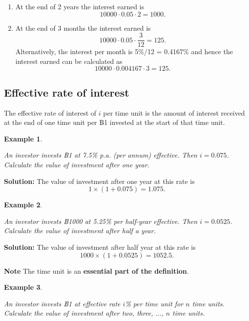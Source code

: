 \documentclass[landscape, 20pt]{extreport}
\theoremstyle{definition}
\theoremstyle{definition}
\newtheorem{example}{Example}[chapter]
\theoremstyle{definition}
\theoremstyle{definition}
\theoremstyle{remark}
\begin{document}
\begin{enumerate}
\def\labelenumi{\arabic{enumi}.}
\item
  At the end of 2 years the interest earned is
  \[10000 \cdot 0.05 \cdot 2 = 1000.\]
\item
  At the end of 3 months the interest earned is
  \[10000 \cdot 0.05 \cdot \frac{3}{12} = 125.\] Alternatively, the
  interest per month is 5\%/12 = 0.4167\% and hence the interest earned
  can be calculated as \[10000 \cdot 0.004167 \cdot 3 = 125.\]
\end{enumerate}

\hypertarget{effective-rate-of-interest}{%
\subsection{Effective rate of interest}\label{effective-rate-of-interest}}

The effective rate of interest of \(i\) per time unit is the amount of
interest received at the end of one time unit per ฿1 invested at the
start of that time unit.

\newpage \begin{example}
\protect\hypertarget{exm:unlabeled-div-4}{}\label{exm:unlabeled-div-4}

\emph{An investor invests ฿1 at 7.5\% p.a. (per annum)
effective. Then \(i = 0.075\). Calculate the value of investment after one
year.}

\end{example}

\textbf{Solution:} The value of investment after one year at this rate is
\[1 \times ( 1 + 0.075) = 1.075.\]

\newpage \begin{example}
\protect\hypertarget{exm:unlabeled-div-5}{}\label{exm:unlabeled-div-5}

\emph{An investor invests ฿1000 at 5.25\% per half-year
effective. Then \(i = 0.0525\). Calculate the value of investment after
half a year.}

\end{example}

\textbf{Solution:} The value of investment after half year at this rate is
\[1000 \times ( 1 + 0.0525) = 1052.5.\]

\textbf{Note} The time unit is an \textbf{essential part of the definition}.

\newpage \begin{example}
\protect\hypertarget{exm:unlabeled-div-6}{}\label{exm:unlabeled-div-6}

\emph{An investor invests ฿1 at effective rate \(i\)\% per time
unit for \(n\) time units. Calculate the value of investment after two,
three, \(\ldots\), \(n\) time units.}

\end{example}
\end{document}
